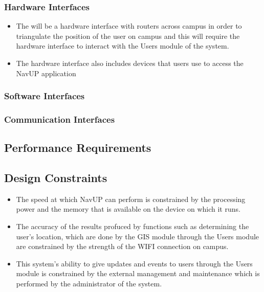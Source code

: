 	\subsubsection{Hardware Interfaces }
	\begin{itemize}
	\item The will be a hardware interface with routers across campus in order to triangulate the position of the user on campus and this will require the hardware interface to interact with the Users module of the system. 
	\item The hardware interface also includes devices that users use to access the NavUP application 
	\end{itemize}
	\subsubsection{Software Interfaces } %
	
	\subsubsection{Communication Interfaces } %
	
\subsection{Performance Requirements} %


\subsection{Design Constraints}
\begin{itemize}

\item The speed at which NavUP can perform is constrained by the processing power and the  memory that is available on the device on which it runs.

\item The accuracy of the results profuced by functions such as determining the user's location, which are done by the GIS module through the Users module are constrained by the strength of the WIFI connection on campus.

\item This system’s ability to give updates and events to users through the Users module is constrained by the external management and maintenance which is performed by the administrator of the system.

\end{itemize}



